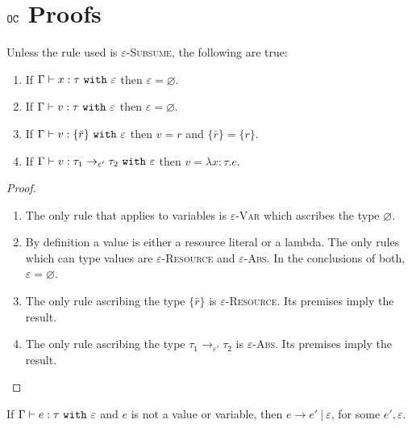 \section{$\mathtt{OC}$ Proofs}


\begin{lemma}
Unless the rule used is \textsc{$\varepsilon$-Subsume}, the following are true:
\begin{enumerate}
	\item If $\Gamma \vdash x: \tau~\mathtt{with}~ \varepsilon$ then $\varepsilon = \varnothing$.
	\item If $ \Gamma \vdash  v:  \tau~\mathtt{with}~ \varepsilon$ then $\varepsilon = \varnothing$.
	\item If $ \Gamma \vdash v: \{ \bar r \}~\mathtt{with}~ \varepsilon$ then $ v = r$ and $\{ \bar r \} = \{ r \}$.
	\item If $\Gamma \vdash v: \tau_1 \rightarrow_{\varepsilon'} \tau_2~\mathtt{with}~ \varepsilon$ then $v = \lambda x:\tau. e$.
\end{enumerate}
\end{lemma}


\begin{proof}
~
\begin{enumerate}
	\item The only rule that applies to variables is \textsc{$\varepsilon$-Var} which ascribes the type $\varnothing$.
	\item By definition a value is either a resource literal or a lambda. The only rules which can type values are \textsc{$\varepsilon$-Resource} and \textsc{$\varepsilon$-Abs}. In the conclusions of both, $\varepsilon = \varnothing$.
	\item The only rule ascribing the type $\{ \bar r \}$ is \textsc{$\varepsilon$-Resource}. Its premises imply the result.
	\item The only rule ascribing the type $\tau_1 \rightarrow_{\varepsilon'} \tau_2$ is \textsc{$\varepsilon$-Abs}. Its premises imply the result.
\end{enumerate}
\end{proof}


\hrulefill


\begin{theorem}
If $ \Gamma \vdash  e:  \tau~\mathtt{with}~ \varepsilon$ and $ e$ is not a value or variable, then $ e \longrightarrow  e'~|~\varepsilon$, for some $e', \varepsilon$.
\end{theorem}


